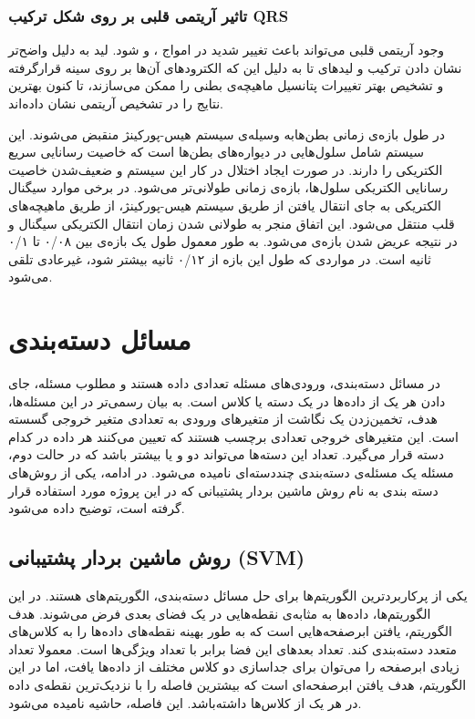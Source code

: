  \subsubsection{تاثیر آریتمی قلبی بر روی شکل ترکیب QRS}
 وجود آریتمی قلبی می‌تواند باعث تغییر شدید در امواج ،  و  شود. لید  به دلیل واضح‌تر نشان دادن ترکیب  و لیدهای  تا  به دلیل این که الکترودهای آن‌ها بر روی سینه قرارگرفته و تشخیص بهتر تغییرات پتانسیل ماهیچه‌ی بطنی را ممکن می‌سازند، تا کنون بهترین نتایج را در تشخیص آریتمی نشان داده‌اند. \cite{ECGSurvey}

در طول بازه‌ی زمانی  بطن‌هابه وسیله‌ی سیستم هیس-پورکینژ منقبض می‌شوند. این سیستم شامل سلول‌هایی در دیواره‌های بطن‌ها است که خاصیت رسانایی سریع الکتریکی را دارند. در صورت ایجاد اختلال در کار این سیستم و ضعیف‌شدن خاصیت رسانایی الکتریکی سلول‌ها، بازه‌ی زمانی  طولانی‌تر می‌شود. در برخی موارد سیگنال الکتریکی به جای انتقال یافتن از طریق سیستم هیس-پورکینژ، از طریق ماهیچه‌های قلب منتقل می‌شود. این اتفاق منجر به طولانی شدن زمان انتقال الکتریکی سیگنال و در نتیجه عریض شدن بازه‌ی  می‌شود.
 به طور معمول طول یک بازه‌ی  بین ۰/۰۸ تا ۰/۱ ثانیه است. در مواردی که طول این بازه از ۰/۱۲ ثانیه بیشتر شود،  غیرعادی تلقی می‌شود. \cite{Healio}

\section{مسائل دسته‌بندی}

در مسائل دسته‌بندی، ورودی‌های مسئله تعدادی داده هستند و مطلوب مسئله، جای دادن هر یک از داده‌ها در یک دسته یا کلاس است. به بیان رسمی‌تر در این مسئله‌ها، هدف، تخمین‌زدن یک نگاشت از متغیرهای ورودی  به تعدادی متغیر خروجی گسسته  است. این متغیرهای خروجی تعدادی برچسب هستند که تعیین می‌کنند هر داده در کدام دسته قرار می‌گیرد. تعداد این دسته‌ها می‌تواند دو و یا بیشتر باشد که در حالت دوم، مسئله یک مسئله‌ی دسته‌بندی چنددسته‌ای نامیده می‌شود. در ادامه، یکی از روش‌های دسته بندی به نام روش ماشین بردار پشتیبانی که در این پروژه مورد استفاده قرار گرفته است، توضیح داده می‌شود.  

\subsection{روش ماشین بردار پشتیبانی (SVM)}
یکی از پرکاربردترین الگوریتم‌ها برای حل مسائل دسته‌بندی، الگوریتم‌های  هستند. در این الگوریتم‌ها، داده‌ها به مثابه‌ی نقطه‌هایی در یک فضای بعدی فرض می‌شوند. هدف الگوریتم، یافتن ابرصفحه‌هایی است که به طور بهینه نقطه‌های داده‌ها را به کلاس‌های متعدد دسته‌بندی کند. تعداد بعدهای این فضا  برابر با تعداد ویژگی‌ها است. معمولا تعداد زیادی ابرصفحه را می‌توان برای جداسازی دو کلاس مختلف از داده‌ها یافت، اما در این الگوریتم، هدف یافتن ابرصفحه‌ای است که بیشترین فاصله را با نزدیک‌ترین نقطه‌ی داده در هر یک از کلاس‌ها داشته‌باشد. این فاصله، حاشیه نامیده می‌شود. 

